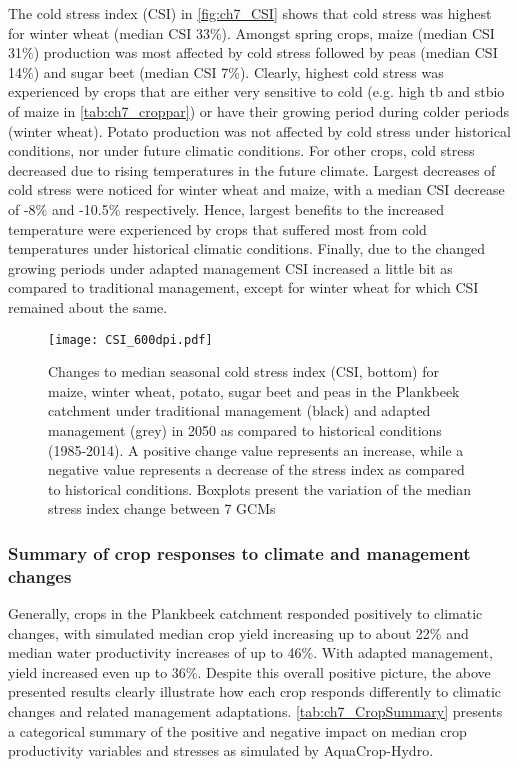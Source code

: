 The cold stress index (CSI) in \autoref{fig:ch7_CSI} shows that cold stress was highest for winter wheat (median CSI 33\%). Amongst spring crops, maize (median CSI 31\%) production was most affected by cold stress followed by peas (median CSI 14\%) and sugar beet (median CSI 7\%). Clearly, highest cold stress was experienced by crops that are either very sensitive to cold (e.g. high tb and stbio of maize in \autoref{tab:ch7_croppar}) or have their growing period during colder periods (winter wheat). Potato production was not affected by cold stress under historical conditions, nor under future climatic conditions. For other crops, cold stress decreased due to rising temperatures in the future climate. Largest decreases of cold stress were noticed for winter wheat and maize, with a median CSI decrease of -8\% and -10.5\% respectively.  Hence, largest benefits to the increased temperature were experienced by crops that suffered most from cold temperatures under historical climatic conditions. Finally, due to the changed growing periods under adapted management CSI increased a little bit as compared to traditional management, except for winter wheat for which CSI remained about the same.

\begin{figure}[tbhp]
	\centering
		\texttt{[image: CSI\_600dpi.pdf]}
	\caption{Changes to median seasonal cold stress index (CSI, bottom) for maize, winter wheat, potato, sugar beet and peas in the Plankbeek catchment under traditional management (black) and adapted management (grey) in 2050 as compared to historical conditions (1985-2014). A positive change value represents an increase, while a negative value represents a decrease of the stress index as compared to historical conditions. Boxplots present the variation of the median stress index change between 7 GCMs}
	\label{fig:ch7_CSI}
\end{figure}   

\subsubsection{Summary of crop responses to climate and management changes}
Generally, crops in the Plankbeek catchment responded positively to climatic changes, with  simulated median crop yield increasing up to about 22\% and median water productivity increases of up to 46\%. With adapted management, yield increased even up to 36\%. Despite this overall positive picture, the above presented results clearly illustrate how each crop responds differently to climatic changes and related management adaptations. \autoref{tab:ch7_CropSummary} presents a categorical summary of the positive and negative impact on median crop productivity variables and stresses as simulated by AquaCrop-Hydro. 

